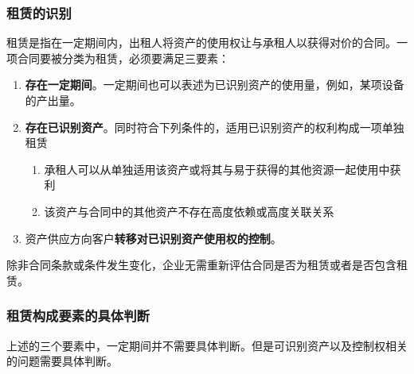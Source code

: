 \documentclass[UTF8,12pt]{ctexart}
\numberwithin{equation}{section} %
\numberwithin{figure}{section}
\numberwithin{table}{section}
\begin{document}
	\subsubsection{租赁的识别}
	租赁是指在一定期间内，出租人将资产的使用权让与承租人以获得对价的合同。一项合同要被分类为租赁，必须要满足三要素：
	\begin{enumerate}
		\item \textbf{存在一定期间}。一定期间也可以表述为已识别资产的使用量，例如，某项设备的产出量。
		
		\item \textbf{存在已识别资产}。同时符合下列条件的，适用已识别资产的权利构成一项单独租赁
		\begin{enumerate}
			\item 承租人可以从单独适用该资产或将其与易于获得的其他资源一起使用中获利
			
			\item 该资产与合同中的其他资产不存在高度依赖或高度关联关系
		\end{enumerate}
		
		\item 资产供应方向客户\textbf{转移对已识别资产使用权的控制}。
	\end{enumerate}
	
	除非合同条款或条件发生变化，企业无需重新评估合同是否为租赁或者是否包含租赁。

	\subsubsection{租赁构成要素的具体判断}
	上述的三个要素中，一定期间并不需要具体判断。但是可识别资产以及控制权相关的问题需要具体判断。
	
\end{document}

